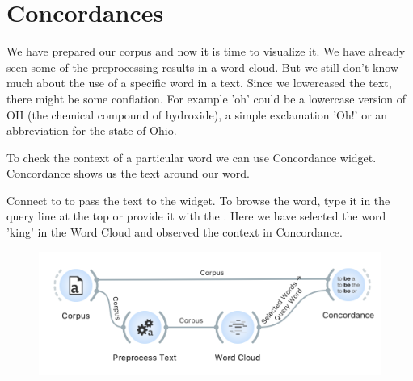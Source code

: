 \chapter{Concordances}

We have prepared our corpus and now it is time to visualize it. We have already seen some of the preprocessing results in a word cloud. But we still don't know much about the use of a specific word in a text. Since we lowercased the text, there might be some conflation. For example 'oh' could be a lowercase version of OH (the chemical compound of hydroxide), a simple exclamation 'Oh!' or an abbreviation for the state of Ohio.

To check the context of a particular word we can use Concordance widget. Concordance shows us the text around our word.

Connect  to  to pass the text to the widget. To browse the word, type it in the query line at the top or provide it with the . Here we have selected the word 'king' in the Word Cloud and observed the context in Concordance.

\vspace{-0.2cm}
\begin{figure}[h]
  \centering
  \includegraphics[width=\linewidth]{workflow.png}%
  \caption{$\;$}
\end{figure}
\vspace{-0.3cm}

